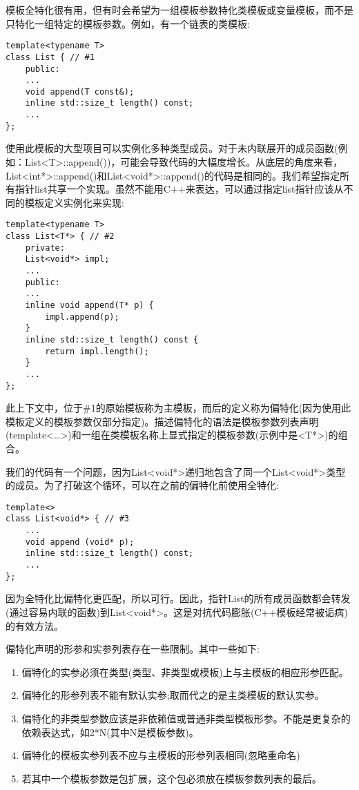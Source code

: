 
模板全特化很有用，但有时会希望为一组模板参数特化类模板或变量模板，而不是只特化一组特定的模板参数。例如，有一个链表的类模板:

\begin{lstlisting}[style=styleCXX]
template<typename T>
class List { // #1
	public:
	...
	void append(T const&);
	inline std::size_t length() const;
	...
};
\end{lstlisting}

使用此模板的大型项目可以实例化多种类型成员。对于未内联展开的成员函数(例如：List<T>::append())，可能会导致代码的大幅度增长。从底层的角度来看，List<int*>::append()和List<void*>::append()的代码是相同的。我们希望指定所有指针list共享一个实现。虽然不能用C++来表达，可以通过指定list指针应该从不同的模板定义实例化来实现:

\begin{lstlisting}[style=styleCXX]
template<typename T>
class List<T*> { // #2
	private:
	List<void*> impl;
	...
	public:
	...
	inline void append(T* p) {
		impl.append(p);
	}
	inline std::size_t length() const {
		return impl.length();
	}
	...
};
\end{lstlisting}

此上下文中，位于\#1的原始模板称为主模板，而后的定义称为偏特化(因为使用此模板定义的模板参数仅部分指定)。描述偏特化的语法是模板参数列表声明(template<…>)和一组在类模板名称上显式指定的模板参数(示例中是<T*>)的组合。

我们的代码有一个问题，因为List<void*>递归地包含了同一个List<void*>类型的成员。为了打破这个循环，可以在之前的偏特化前使用全特化:

\begin{lstlisting}[style=styleCXX]
template<>
class List<void*> { // #3
	...
	void append (void* p);
	inline std::size_t length() const;
	...
};
\end{lstlisting}

因为全特化比偏特化更匹配，所以可行。因此，指针List的所有成员函数都会转发(通过容易内联的函数)到List<void*>。这是对抗代码膨胀(C++模板经常被诟病)的有效方法。

偏特化声明的形参和实参列表存在一些限制。其中一些如下:

\begin{enumerate}
\item 
偏特化的实参必须在类型(类型、非类型或模板)上与主模板的相应形参匹配。

\item 
偏特化的形参列表不能有默认实参;取而代之的是主类模板的默认实参。

\item 
偏特化的非类型参数应该是非依赖值或普通非类型模板形参。不能是更复杂的依赖表达式，如2*N(其中N是模板参数)。

\item 
偏特化的模板实参列表不应与主模板的形参列表相同(忽略重命名)

\item 
若其中一个模板参数是包扩展，这个包必须放在模板参数列表的最后。
\end{enumerate}


